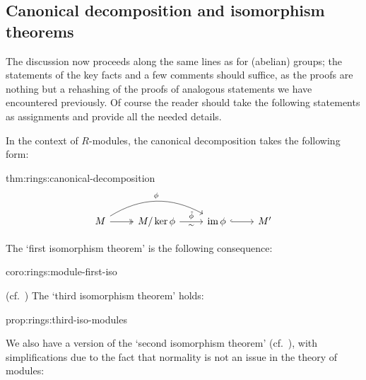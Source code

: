 \subsection{Canonical decomposition and isomorphism theorems}
\label{subsec:rings:canonical-decomposition-and-isomorphism-theorems}
The discussion now proceeds along the same lines as for (abelian)
groups; the statements of the key facts and a few comments should
suffice, as the proofs are nothing but a rehashing of the proofs of
analogous statements we have encountered previously. Of course the
reader should take the following statements as assignments and provide
all the needed details.

In the context of $R$-modules, the canonical decomposition takes the
following form:
\begin{thm}{}{thm:rings:canonical-decomposition}
  \[\begin{tikzcd}
      M \arrow[r, two heads] \arrow[rr, bend left, "\phi"] &
      M/\ker\phi \arrow[r, "\tilde{\phi}", "\sim"'] & \image\phi
      \arrow[r, hook] & M'
    \end{tikzcd}\]
\end{thm}

The `first isomorphism theorem' is the following consequence:
\begin{coro}{}{coro:rings:module-first-iso}
\end{coro}
 (cf.\ ) The `third
isomorphism theorem' holds:

\begin{prop}{}{prop:rings:third-iso-modules}
\end{prop}
We also have a version of the `second isomorphism theorem' (cf.\
), with simplifications
due to the fact that normality is not an issue in the theory of
modules:

